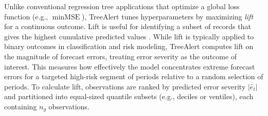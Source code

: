 \documentclass[]{interact}
\theoremstyle{definition}
\begin{document}
Unlike conventional regression tree applications that optimize a global loss function (e.g., $\min \text{MSE}$), TreeAlert tunes hyperparameters by maximizing \emph{lift} for a continuous outcome. Lift is useful for identifying a subset of records that gives the highest cumulative predicted values \citep{shmueli2023machineR}. While lift is typically applied to binary outcomes in classification and risk modeling, TreeAlert computes lift on the magnitude of forecast errors, treating error severity as the outcome of interest. This measures how effectively the model concentrates extreme forecast errors for a targeted high-risk segment of periods relative to a random selection of periods. To calculate lift, observations are ranked by predicted error severity $|\hat{e}_t|$ and partitioned into equal-sized quantile subsets (e.g., deciles or ventiles), each containing \( n_g \) observations. %


\end{document}
